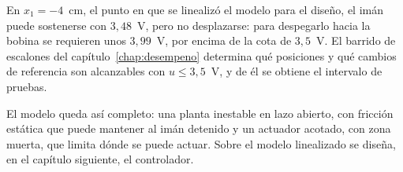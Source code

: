 En $x_1=-4$~cm, el punto en que se linealizó el modelo para el diseño, el imán puede sostenerse con $3{,}48$~V, pero no desplazarse: para despegarlo hacia la bobina se requieren unos $3{,}99$~V, por encima de la cota de $3{,}5$~V. El barrido de escalones del capítulo~\ref{chap:desempeno} determina qué posiciones y qué cambios de referencia son alcanzables con $u\le3{,}5$~V, y de él se obtiene el intervalo de pruebas.

El modelo queda así completo: una planta inestable en lazo abierto, con fricción estática que puede mantener al imán detenido y un actuador acotado, con zona muerta, que limita dónde se puede actuar. Sobre el modelo linealizado se diseña, en el capítulo siguiente, el controlador.
